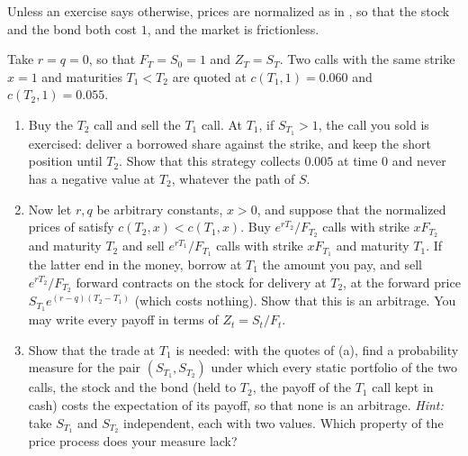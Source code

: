 
Unless an exercise says otherwise, prices are normalized as in , so that the stock and the bond
both cost $1$, and the market is frictionless.

\begin{exercise}\label{ex:afs-calendar}
\easy Take $r=q=0$, so that $F_T=S_0=1$ and $Z_T=S_T$. Two calls with the same strike $x=1$ and maturities $T_1<T_2$ are
quoted at $c(T_1,1)=0.060$ and $c(T_2,1)=0.055$.
\begin{enumerate}[label=(\alph*)]
  \item Buy the $T_2$ call and sell the $T_1$ call. At $T_1$, if $S_{T_1}>1$, the call you sold is exercised: deliver a borrowed
    share against the strike, and keep the short position until $T_2$. Show that this strategy collects $0.005$ at time
    $0$ and never has a negative value at $T_2$, whatever the path of $S$.
  \item Now let $r,q$ be arbitrary constants, $x>0$, and suppose that the normalized prices of  satisfy
    $c(T_2,x)<c(T_1,x)$. Buy $e^{rT_2}/F_{T_2}$ calls with strike $xF_{T_2}$ and maturity $T_2$ and sell $e^{rT_1}/F_{T_1}$ calls with strike
    $xF_{T_1}$ and maturity $T_1$. If the latter end in the money, borrow at $T_1$ the amount you pay, and sell $e^{rT_2}/F_{T_2}$
    forward contracts on the stock for delivery at $T_2$, at the forward price $S_{T_1}e^{(r-q)(T_2-T_1)}$ (which costs nothing).
    Show that this is an arbitrage. You may write every payoff in terms of $Z_t=S_t/F_t$.
  \item Show that the trade at $T_1$ is needed: with the quotes of (a), find a probability measure for the pair $(S_{T_1},S_{T_2})$
    under which every static portfolio of the two calls, the stock and the bond (held to $T_2$, the payoff of the $T_1$ call kept in
    cash) costs the expectation of its payoff, so that none is an arbitrage. \emph{Hint:} take $S_{T_1}$ and $S_{T_2}$ independent,
    each with two values. Which property of the price process does your measure lack?
\end{enumerate}
\end{exercise}

